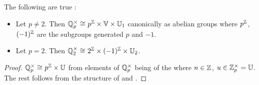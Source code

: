 \begin{prop}

  The following are true : 
  \begin{itemize}
    \item Let $p \neq 2$. 
    Then $\mathbb{Q}_p^\times \cong_{} p^{\mathbb{Z}} \times \mathbb{V} \times \mathbb{U}_1$ 
    canonically as abelian groups
    where $p^{\mathbb{Z}}$, $(-1)^{\mathbb{Z}}$ are the subgroups generated $p$ and $-1$. 
    \item Let $p = 2$.
    Then $\mathbb{Q}_2^\times \cong_{} 2^{\mathbb{Z}} \times (-1)^{\mathbb{Z}} \times \mathbb{U}_2$.
  \end{itemize}
\end{prop}
\begin{proof}
  $\mathbb{Q}_p^\times \cong_{} p^{\mathbb{Z}} \times \mathbb{U}$ from 
  elements of $\mathbb{Q}_p^\times$ being of the
   where 
  $n \in \mathbb{Z}$, $u \in \mathbb{Z}_p^\times = \mathbb{U}$.
  The rest follows from the structure of 
   and .
\end{proof}

